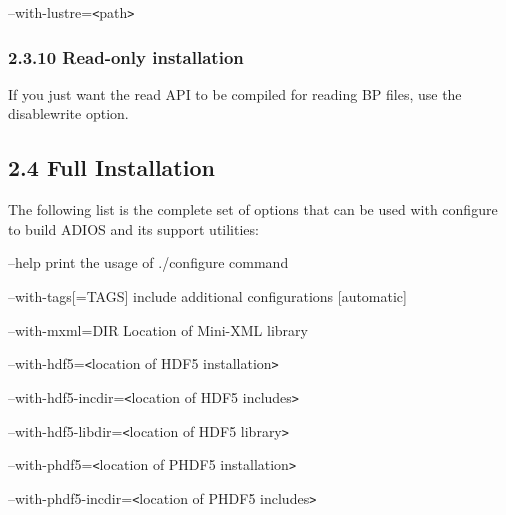 \vspace{10pt}
--with-lustre=\texttt{<}path\texttt{>}\label{HToc84890231}\label{HToc212016606}\label{HToc212016848}\label{HToc182553344}

\vspace{22pt}
\subsubsection*{{\large \textbf{2.3.10 Read-only installation}}}

\vspace{10pt}
If you just want the read API to be compiled for reading BP files, use the \-{}\-{}disable\-{}write 
option.\label{HToc182553345}

\vspace{10pt}
\subsection*{{\large 2.4 }{\large \textbf{Full Installation}}}

\vspace{10pt}
The following list is the complete set of options that can be used {\color{color01} with 
configure to build ADIOS and its support utilities:}

\vspace{10pt}
\parindent=7pt
{\color{color01} --help              print the usage of ./configure command}

\vspace{10pt}
--with-tags[=TAGS]  include additional configurations [automatic]

\vspace{10pt}
--with-mxml=DIR     Location of Mini-XML library

\vspace{10pt}
\parindent=0pt
--with-hdf5=\texttt{<}location of HDF5 installation\texttt{>}

\vspace{10pt}
\parindent=7pt
--with-hdf5-incdir=\texttt{<}location of HDF5 includes\texttt{>}

\vspace{10pt}
--with-hdf5-libdir=\texttt{<}location of HDF5 library\texttt{>}

\vspace{10pt}
\parindent=0pt
--with-phdf5=\texttt{<}location of PHDF5 installation\texttt{>}

\vspace{10pt}
\parindent=7pt
--with-phdf5-incdir=\texttt{<}location of PHDF5 includes\texttt{>}

